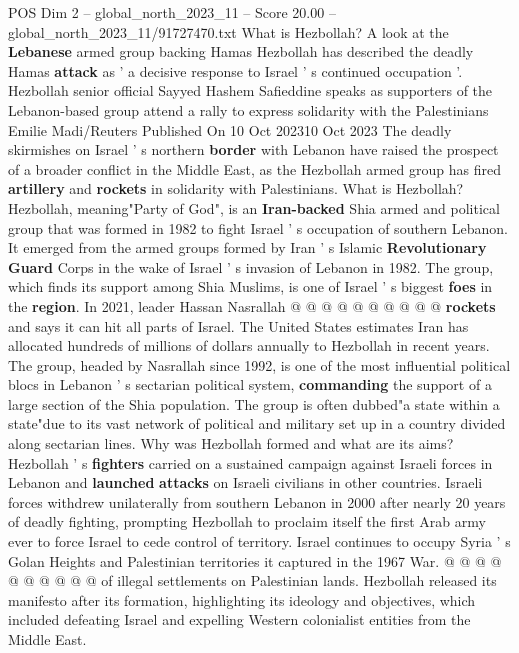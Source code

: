 \begin{textsample}{POS Dim 2 – global\_north\_2023\_11 – Score 20.00 – global\_north\_2023\_11/91727470.txt}  \label{ex:f2_pos_310}
What is Hezbollah?
A look at the \textbf{Lebanese} armed group backing Hamas Hezbollah has described the deadly Hamas \textbf{attack} as ' a decisive response to Israel ' s continued occupation '.
Hezbollah senior official Sayyed Hashem Safieddine speaks as supporters of the Lebanon-based group attend a rally to express solidarity with the Palestinians Emilie Madi/Reuters Published On 10 Oct 202310 Oct 2023 The deadly skirmishes on Israel ' s northern \textbf{border} with Lebanon have raised the prospect of a broader conflict in the Middle East, as the Hezbollah armed group has fired \textbf{artillery} and \textbf{rockets} in solidarity with Palestinians.
What is Hezbollah?
Hezbollah, meaning"Party of God", is an \textbf{Iran-backed} Shia armed and political group that was formed in 1982 to fight Israel ' s occupation of southern Lebanon.
It emerged from the armed groups formed by Iran ' s Islamic \textbf{Revolutionary} \textbf{Guard} Corps in the wake of Israel ' s invasion of Lebanon in 1982.
The group, which finds its support among Shia Muslims, is one of Israel ' s biggest \textbf{foes} in the \textbf{region}.
In 2021, leader Hassan Nasrallah @ @ @ @ @ @ @ @ @ @ \textbf{rockets} and says it can hit all parts of Israel.
The United States estimates Iran has allocated hundreds of millions of dollars annually to Hezbollah in recent years.
The group, headed by Nasrallah since 1992, is one of the most influential political blocs in Lebanon ' s sectarian political system, \textbf{commanding} the support of a large section of the Shia population.
The group is often dubbed"a state within a state"due to its vast network of political and military set up in a country divided along sectarian lines.
Why was Hezbollah formed and what are its aims?
Hezbollah ' s \textbf{fighters} carried on a sustained campaign against Israeli forces in Lebanon and \textbf{launched} \textbf{attacks} on Israeli civilians in other countries.
Israeli forces withdrew unilaterally from southern Lebanon in 2000 after nearly 20 years of deadly fighting, prompting Hezbollah to proclaim itself the first Arab army ever to force Israel to cede control of territory.
Israel continues to occupy Syria ' s Golan Heights and Palestinian territories it captured in the 1967 War. @ @ @ @ @ @ @ @ @ @ of illegal settlements on Palestinian lands.
Hezbollah released its manifesto after its formation, highlighting its ideology and objectives, which included defeating Israel and expelling Western colonialist entities from the Middle East.

\end{textsample}
